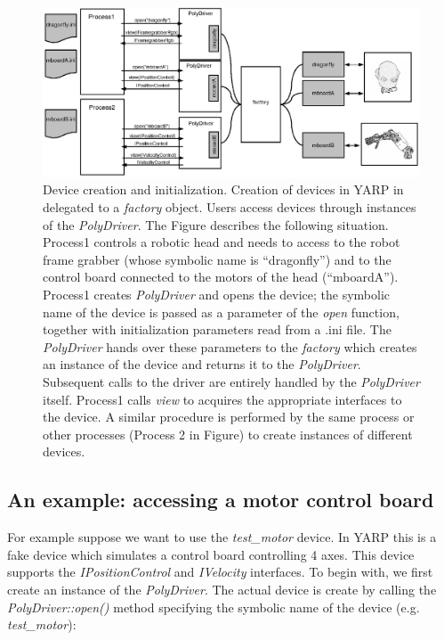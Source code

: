 \begin{figure}[tbp]
\centerline{
\includegraphics[width=20cm]{fig-devices4}
}
\caption{Device creation and initialization. Creation of 
devices in YARP in delegated to a \emph{factory} object. Users 
access devices through instances of the \emph{PolyDriver}. The 
Figure describes the following situation. Process1 controls a robotic
head and needs to access to the robot frame grabber (whose symbolic name 
is ``dragonfly'') and to the control board connected to the motors of 
the head (``mboardA''). Process1 creates \emph{PolyDriver} and opens 
the device; the symbolic name of the device is passed as a parameter
of the \emph{open} function, together with initialization parameters 
read from a .ini file. The \emph{PolyDriver} hands over these parameters 
to the \emph{factory} which creates an instance of the device and returns
it to the \emph{PolyDriver}. Subsequent calls to the driver are entirely 
handled by the \emph{PolyDriver} itself. Process1 calls \emph{view} to 
acquires the appropriate interfaces to the device. A similar procedure 
is performed by the same process or other processes (Process 2 in Figure) 
to create instances of different devices.}\label{fig:devices4}
\end{figure}

\subsection{An example: accessing a motor control board}
For example suppose we want to use the \emph{test\_motor} device. In 
YARP this is a fake device which simulates a control board controlling 
4 axes. This device supports the \emph{IPositionControl} and 
\emph{IVelocity} interfaces. To begin with, we first create an 
instance of the \emph{PolyDriver}. The actual device is create by 
calling the \emph{PolyDriver::open()} method specifying the symbolic 
name of the device (e.g. \emph{test\_motor}):

